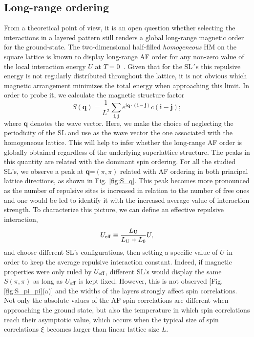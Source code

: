 \documentclass[aps,pra,reprint,twocolumn,showpacs,longbibliography,superscriptaddress]{revtex4-1}
\begin{document}


\subsection{Long-range ordering}
From a theoretical point of view, it is an open question whether selecting the interactions in a layered pattern still renders a global long-range magnetic order for the ground-state. The two-dimensional half-filled \textit{homogeneous} HM on the square lattice is known to display long-range AF order for any non-zero value of the local interaction energy $U$ at $T=0$~\cite{Hirsch85}. Given that for the SL´s this repulsive energy is not regularly distributed throughout the lattice, it is not obvious which magnetic arrangement minimizes the total energy when approaching this limit. In order to probe it, we calculate the magnetic structure factor
\begin{equation}
S(\mathbf{q})=\frac{1}{L^2}\sum_{\mathbf{i},\mathbf{j}}e^{i\mathbf{q}\cdot(\mathbf{i}-\mathbf{j})}c(\mathbf{i}-\mathbf{j});
\end{equation}
where \textbf{q} denotes the wave vector. Here, we make the choice of neglecting the periodicity of the SL and use as the wave vector the one associated with the homogeneous lattice. This will help to infer whether the long-range AF order is globally obtained regardless of the underlying superlattice structure. The  peaks in this quantity are related with the dominant spin ordering. For all the studied SL's, we observe a peak at \textbf{q}=$(\pi,\pi)$ related with AF ordering in both principal lattice directions, as shown in Fig. \ref{fig:S_q}. This peak becomes more pronounced as the number of repulsive sites is increased in relation to the number of free ones and one would be led to identify it with the increased average value of interaction strength. To characterize this picture, we can define an effective repulsive interaction,
\begin{equation}
U_{\rm eff} \equiv \frac{L_{\rm U}}{L_{\rm U}+L_0} U,
\end{equation}
and choose different SL's configurations, then setting a specific value of $U$ in order to keep the average repulsive interaction constant. Indeed, if magnetic properties were only ruled by $U_{\rm eff}$, different SL's would display the same $S(\pi,\pi)$ as long as  $U_{\rm eff}$ is kept fixed. However, this is not observed [Fig. \ref{fig:S_pi_pi}(a)] and the widths of the layers  strongly affect spin correlations. Not only the absolute values of the AF spin correlations are different when approaching the ground state, but also the temperature in which spin correlations reach their asymptotic value, which  occurs when the typical size of spin correlations $\xi$ becomes larger than linear lattice size $L$.
\end{document}
